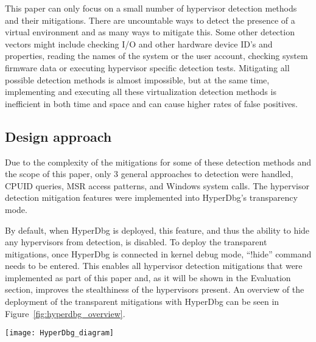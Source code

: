 This paper can only focus on a small number of hypervisor detection methods and their mitigations. There are uncountable ways to detect the presence of a virtual environment and as many ways to mitigate this.
Some other detection vectors might include checking I/O and other hardware device ID's and properties, reading the names of the system or the user account, checking system firmware data or executing hypervisor specific detection tests.
Mitigating all possible detection methods is almost impossible, but at the same time, implementing and executing all these virtualization detection methods is inefficient in both time and space and can cause higher rates of false positives.


\subsection{Design approach}\label{design_approach}
Due to the complexity of the mitigations for some of these detection methods and the scope of this paper, only 3 general approaches to detection were handled, CPUID queries, MSR access patterns, and Windows system calls. 
The hypervisor detection mitigation features were implemented into HyperDbg's transparency mode. 

By default, when HyperDbg is deployed, this feature, and thus the ability to hide any hypervisors from detection, is disabled. To deploy the transparent mitigations, 
once HyperDbg is connected in kernel debug mode, “!hide” command needs to be entered. This enables all hypervisor detection mitigations that were implemented as part of this paper and, 
as it will be shown in the Evaluation section, improves the stealthiness of the hypervisors present. An overview of the deployment of the transparent mitigations with HyperDbg can be seen in Figure~\ref{fig:hyperdbg_overview}.

\begin{figure*}[t]
    \texttt{[image: HyperDbg\_diagram]} %
    \label{fig:hyperdbg_overview}
\end{figure*}


